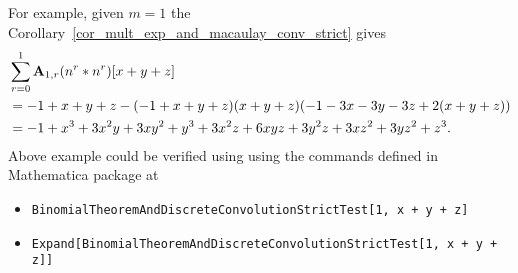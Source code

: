 For example, given $m=1$ the Corollary~\ref{cor_mult_exp_and_macaulay_conv_strict} gives
\begin{equation*}
    \begin{split}
        &\sum_{r=0}^{1} {\mathbf{A}} \sb{1,r} (n \sp{r} \ast n \sp{r}) [x+y+z] \\
        &=-1 + x + y + z - (-1 + x + y + z) (x + y + z) (-1 - 3 x - 3 y - 3 z + 2 (x + y + z)) \\
        &=-1 + x^3 + 3 x^2 y + 3 x y^2 + y^3 + 3 x^2 z + 6 x y z + 3 y^2 z + 3 x z^2 + 3 y z^2 + z^3.
    \end{split}
\end{equation*}
Above example could be verified using using the commands defined in Mathematica package at~\cite{github_source_files}
\begin{itemize}
    \item \texttt{BinomialTheoremAndDiscreteConvolutionStrictTest[1, x + y + z]}
    \item \texttt{Expand[BinomialTheoremAndDiscreteConvolutionStrictTest[1, x + y + z]]}
\end{itemize}
